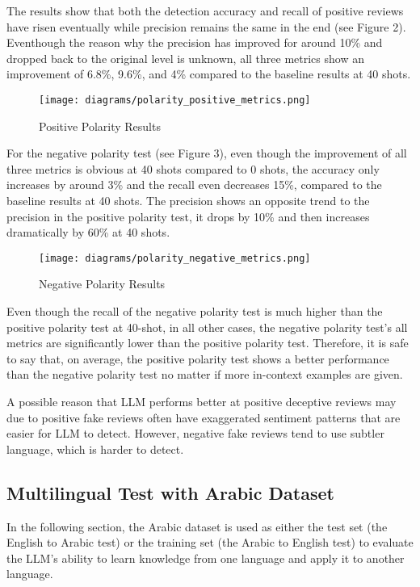 \documentclass[sigconf, nonacm]{acmart}
\theoremstyle{definition}
\begin{document}
The results show that both the detection accuracy and recall of positive reviews have risen eventually while precision remains the same in the end (see Figure 2). Eventhough the reason why the precision has improved for around 10\% and dropped back to the original level is unknown, all three metrics show an improvement of 6.8\%, 9.6\%, and 4\% compared to the baseline results at 40 shots.

\begin{figure}[h]
  \centering
  \texttt{[image: diagrams/polarity\_positive\_metrics.png]}
  \caption{Positive Polarity Results}
\end{figure}

For the negative polarity test (see Figure 3), even though the improvement of all three metrics is obvious at 40 shots compared to 0 shots, the accuracy only increases by around 3\% and the recall even decreases 15\%, compared to the baseline results at 40 shots. The precision shows an opposite trend to the precision in the positive polarity test, it drops by 10\% and then increases dramatically by 60\% at 40 shots.

\begin{figure}[h]
  \centering
  \texttt{[image: diagrams/polarity\_negative\_metrics.png]}
  \caption{Negative Polarity Results}
\end{figure}

Even though the recall of the negative polarity test is much higher than the positive polarity test at 40-shot, in all other cases, the negative polarity test's all metrics are significantly lower than the positive polarity test. Therefore, it is safe to say that, on average, the positive polarity test shows a better performance than the negative polarity test no matter if more in-context examples are given.

A possible reason that LLM performs better at positive deceptive reviews may due to positive fake reviews often have exaggerated sentiment patterns that are easier for LLM to detect. However, negative fake reviews tend to use subtler language, which is harder to detect.

\subsection{Multilingual Test with Arabic Dataset}
In the following section, the Arabic dataset is used as either the test set (the English to Arabic test) or the training set (the Arabic to English test) to evaluate the LLM's ability to learn knowledge from one language and apply it to another language.
\end{document}

